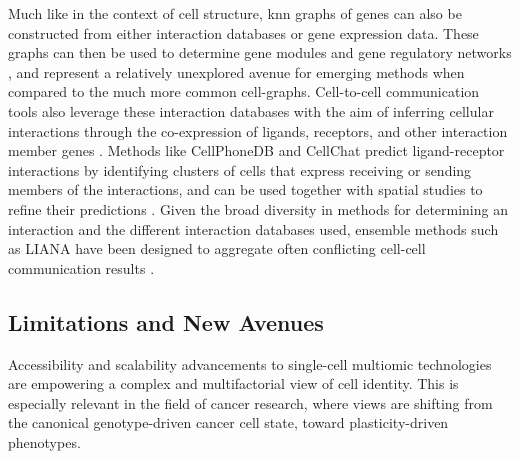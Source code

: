 Much like in the context of cell structure, \acrshort{knn} graphs of genes can also be constructed from either interaction databases or gene expression data. These graphs can then be used to determine gene modules and gene regulatory networks \cite{aibar_scenic_2017}, and represent a relatively unexplored avenue for emerging methods when compared to the much more common cell-graphs.
Cell-to-cell communication tools also leverage these interaction databases with the aim of inferring cellular interactions through the co-expression of ligands, receptors, and other interaction member genes \cite{armingol_deciphering_2020}. Methods like CellPhoneDB \cite{efremova_cellphonedb_2020} and CellChat \cite{jin_inference_2021} predict ligand-receptor interactions by identifying clusters of cells that express receiving or sending members of the interactions, and can be used together with spatial studies to refine their predictions \cite{hu_cytotalk_2021,kanemaru_spatially_2023}. Given the broad diversity in methods for determining an interaction and the different interaction databases used, ensemble methods such as LIANA have been designed to aggregate often conflicting cell-cell communication results \cite{dimitrov_comparison_2022, baghdassarian_combining_2023}. 


\subsection{Limitations and New Avenues}

Accessibility and scalability advancements to single-cell multiomic technologies are empowering a complex and multifactorial view of cell identity. This is especially relevant in the field of cancer research, where views are shifting from the canonical genotype-driven cancer cell state, toward plasticity-driven phenotypes. 

